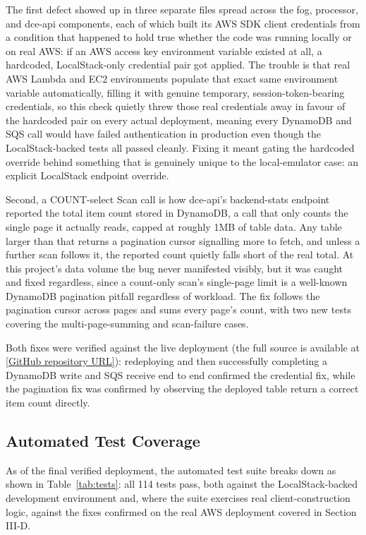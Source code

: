 \documentclass[conference]{IEEEtran}
\begin{document}
The first defect showed up in three separate files spread across the fog, processor, and dce-api components, each of which built its AWS SDK client credentials from a condition that happened to hold true whether the code was running locally or on real AWS: if an AWS access key environment variable existed at all, a hardcoded, LocalStack-only credential pair got applied. The trouble is that real AWS Lambda and EC2 environments populate that exact same environment variable automatically, filling it with genuine temporary, session-token-bearing credentials, so this check quietly threw those real credentials away in favour of the hardcoded pair on every actual deployment, meaning every DynamoDB and SQS call would have failed authentication in production even though the LocalStack-backed tests all passed cleanly. Fixing it meant gating the hardcoded override behind something that is genuinely unique to the local-emulator case: an explicit LocalStack endpoint override.

Second, a COUNT-select Scan call is how dce-api's backend-stats endpoint reported the total item count stored in DynamoDB, a call that only counts the single page it actually reads, capped at roughly 1MB of table data. Any table larger than that returns a pagination cursor signalling more to fetch, and unless a further scan follows it, the reported count quietly falls short of the real total. At this project's data volume the bug never manifested visibly, but it was caught and fixed regardless, since a count-only scan's single-page limit is a well-known DynamoDB pagination pitfall regardless of workload. The fix follows the pagination cursor across pages and sums every page's count, with two new tests covering the multi-page-summing and scan-failure cases.

Both fixes were verified against the live deployment (the full source is available at \href{[GitHub repository URL]}{[GitHub repository URL]}): redeploying and then successfully completing a DynamoDB write and SQS receive end to end confirmed the credential fix, while the pagination fix was confirmed by observing the deployed table return a correct item count directly.

\subsection{Automated Test Coverage}
As of the final verified deployment, the automated test suite breaks down as shown in Table~\ref{tab:tests}: all 114 tests pass, both against the LocalStack-backed development environment and, where the suite exercises real client-construction logic, against the fixes confirmed on the real AWS deployment covered in Section III-D.
\end{document}
